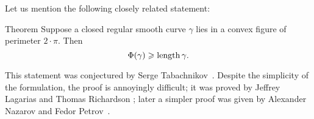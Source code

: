 Let us mention the following closely related statement:

\begin{thm}{Theorem}
Suppose a closed regular smooth curve $\gamma$ lies in a convex figure of perimeter $2\cdot \pi$.
Then 
\[\Phi({\gamma})\geqslant \mathop{\rm length}\nolimits\gamma.\]

\end{thm}

This statement was conjectured by Serge Tabachnikov~\cite{tabachnikov}.
Despite the simplicity of the formulation, the proof is annoyingly difficult;
it was proved by Jeffrey Lagarias and Thomas Richardson \cite{lagarias-richardso}; later a simpler proof was given by Alexander Nazarov and Fedor Petrov~\cite{nazarov-petrov}.

